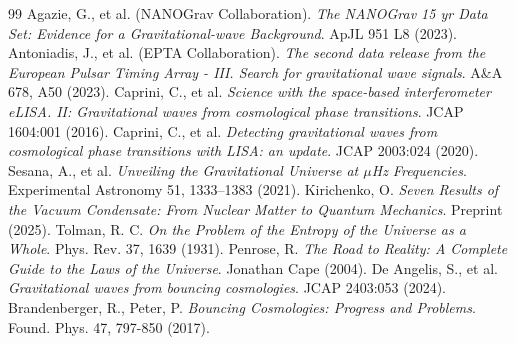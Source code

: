\documentclass[12pt,a4paper]{article}
\begin{document}
\begin{thebibliography}{99}
 Agazie, G., et al. (NANOGrav Collaboration). \textit{The NANOGrav 15 yr Data Set: Evidence for a Gravitational-wave Background}. ApJL 951 L8 (2023).
 Antoniadis, J., et al. (EPTA Collaboration). \textit{The second data release from the European Pulsar Timing Array - III. Search for gravitational wave signals}. A\&A 678, A50 (2023).
 Caprini, C., et al. \textit{Science with the space-based interferometer eLISA. II: Gravitational waves from cosmological phase transitions}. JCAP 1604:001 (2016).
 Caprini, C., et al. \textit{Detecting gravitational waves from cosmological phase transitions with LISA: an update}. JCAP 2003:024 (2020).
 Sesana, A., et al. \textit{Unveiling the Gravitational Universe at $\mu$Hz Frequencies}. Experimental Astronomy 51, 1333–1383 (2021).
 Kirichenko, O. \textit{Seven Results of the Vacuum Condensate: From Nuclear Matter to Quantum Mechanics}. Preprint (2025).
 Tolman, R. C. \textit{On the Problem of the Entropy of the Universe as a Whole}. Phys. Rev. 37, 1639 (1931).
 Penrose, R. \textit{The Road to Reality: A Complete Guide to the Laws of the Universe}. Jonathan Cape (2004).
 De Angelis, S., et al. \textit{Gravitational waves from bouncing cosmologies}. JCAP 2403:053 (2024).
 Brandenberger, R., Peter, P. \textit{Bouncing Cosmologies: Progress and Problems}. Found. Phys. 47, 797-850 (2017).
\end{thebibliography}
\end{document}
